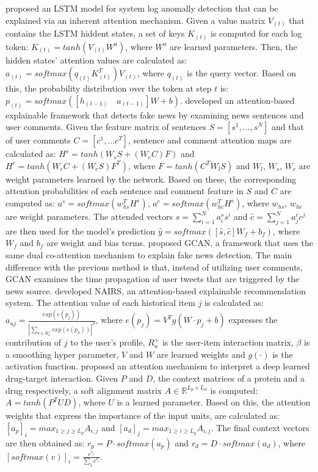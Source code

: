 \documentclass[journal]{IEEEtran}
\begin{document}
\cite{Brown2018} proposed an LSTM model for system log anomally detection that can be explained via an inherent attention mechanism. Given a value matrix $V_{(t)}$ that contains the LSTM hiddent states, a set of keys $K_{(t)}$ is computed for each log token: $K_{(t)}=tanh(V_{(t)}W^a)$, where $W^a$ are learned parameters. Then, the hidden states' attention values are calculated as: $a_{(t)}=softmax(q_{(t)}K^T_{(t)})V_{(t)}$, where $q_{(t)}$ is the query vector. Based on this, the probability distribution over the token at step $t$ is: $p_{(t)}=softmax([h_{(t-1)} \quad a_{(t-1)}]W+b)$.
\cite{Shu2019} developed an attention-based explainable framework that detects fake news by examining news sentences and user comments. Given the feature matrix of sentences $S=[s^1,...,s^N]$ and that of user comments $C=[c^1,...c^T]$, sentence and comment attention maps are calculated as: $H^s=tanh(W_sS+(W_cC)F)$ and $H^c=tanh(W_cC+(W_cS)F^T)$, where $F=tanh(C^TW_lS)$ and $W_l$, $W_s$, $W_c$ are weight parameters learned by the network. Based on these, the corresponding attention probabilities of each sentence and comment feature in $S$ and $C$ are computed as: $a^s=softmax(w_{hs}^TH^s)$, $a^c=softmax(w_{hc}^TH^c)$, where $w_{hs}$, $w_{hc}$ are weight parameters. The attended vectors $\hat{s}=\sum_{i=1}^Na_i^ss^i$ and $\hat{c}=\sum_{j=1}^Na_j^cc^j$ are then used for the model's prediction $\hat{y}=softmax([\hat{s},\hat{c}]W_f+b_f)$, where $W_f$ and $b_f$ are weight and bias terms.
\cite{Lu2020} proposed GCAN, a framework that uses the same dual co-attention mechanism to explain fake news detection. The main difference with the previous method is that, instead of utilizing user comments, GCAN examines the time propagation of user tweets that are triggered by the news source.
\cite{Yu2019} developed NAIRS, an attention-based explainable recommendation system. The attention value of each historical item $j$ is calculated as: 
$a_{uj}=\frac{exp(e(p_j))}{|\sum_{k \in R_u^+}exp(e(p_k))|^\beta}$, where $e(p_j)=V^Tg(W \cdot p_j+b)$ expresses the contribution of $j$ to the user's profile, $R_u^+$ is the user-item interaction matrix, $\beta$ is a smoothing hyper parameter, $V$ and $W$ are learned weights and $g(\cdot)$ is the activation function.
\cite{YingkaiGao2018} proposed an attention mechanism to interpret a deep learned drug-target interaction. Given $P$ and $D$, the context matrices of a protein and a drug respectively, a soft alignment matrix $A \in \mathbb{R}^{L_p \times L_d}$ is computed: $A=tanh(P^TUD)$, where $U$ is a learned parameter. Based on this, the attention weights that express the importance of the input units, are calculated as: $[a_p]_i=max_{1 \geq j \geq L_d}A_{i,j}$ and $[a_d]_j=max_{1 \geq i \geq L_p}A_{i,j}$. The final context vectors are then obtained as: $r_p=P \cdot softmax(a_p)$ and $r_d=D \cdot softmax(a_d)$, where $[softmax(v)]_i=\frac{e^{v_i}}{\sum_j e^{v_i}}$.
\end{document}
